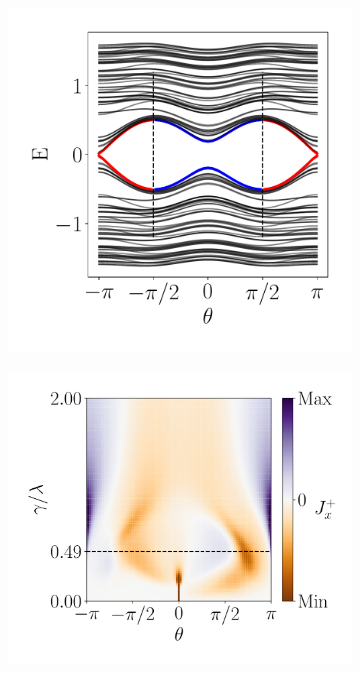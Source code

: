 \begin{figure}[h!]
     \centering
    \captionsetup[sub]{font=small}
     \begin{minipage}[h!]{1\textwidth}
         \begin{subfigure}[b!]{0.3 \textwidth}
             \caption{}
             \includegraphics[width=\textwidth]{Imagenes/Resultados_pump_Fractal/y/param_pump_A=0.5y.pdf}
             \label{}
         \end{subfigure}\hspace*{-0.5em}
         \begin{subfigure}[b!]{0.35 \textwidth}
             \caption{}
             \includegraphics[width=\textwidth]{Imagenes/Resultados_pump_Fractal/y/current_square_pumpy.pdf}

\end{subfigure}
\end{minipage}
\end{figure}
